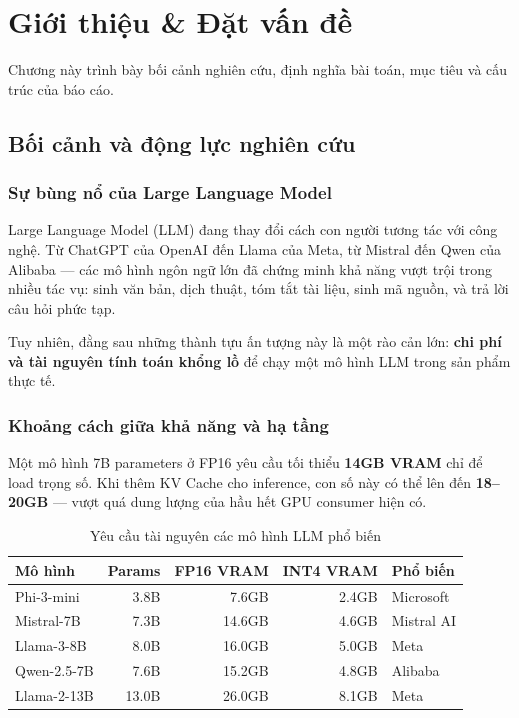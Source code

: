 \documentclass[12pt,a4paper]{report}
\begin{document}
\newpage

\chapter{Giới thiệu \& Đặt vấn đề}

Chương này trình bày bối cảnh nghiên cứu, định nghĩa bài toán, mục tiêu và cấu trúc của báo cáo.

\section{Bối cảnh và động lực nghiên cứu}

\subsection{Sự bùng nổ của Large Language Model}

Large Language Model (LLM) đang thay đổi cách con người tương tác với công nghệ. Từ ChatGPT của OpenAI đến Llama của Meta, từ Mistral đến Qwen của Alibaba --- các mô hình ngôn ngữ lớn đã chứng minh khả năng vượt trội trong nhiều tác vụ: sinh văn bản, dịch thuật, tóm tắt tài liệu, sinh mã nguồn, và trả lời câu hỏi phức tạp.

Tuy nhiên, đằng sau những thành tựu ấn tượng này là một rào cản lớn: \textbf{chi phí và tài nguyên tính toán khổng lồ} để chạy một mô hình LLM trong sản phẩm thực tế.

\subsection{Khoảng cách giữa khả năng và hạ tầng}

Một mô hình 7B parameters ở FP16 yêu cầu tối thiểu \textbf{14GB VRAM} chỉ để load trọng số. Khi thêm KV Cache cho inference, con số này có thể lên đến \textbf{18--20GB} --- vượt quá dung lượng của hầu hết GPU consumer hiện có.

\begin{table}[h]
\centering
\caption{Yêu cầu tài nguyên các mô hình LLM phổ biến}
\label{tab:model-requirements}
\begin{tabular}{lrrrl}
\toprule
\textbf{Mô hình} & \textbf{Params} & \textbf{FP16 VRAM} & \textbf{INT4 VRAM} & \textbf{Phổ biến} \\
\midrule
Phi-3-mini & 3.8B & 7.6GB & 2.4GB & Microsoft \\
Mistral-7B & 7.3B & 14.6GB & 4.6GB & Mistral AI \\
Llama-3-8B & 8.0B & 16.0GB & 5.0GB & Meta \\
Qwen-2.5-7B & 7.6B & 15.2GB & 4.8GB & Alibaba \\
Llama-2-13B & 13.0B & 26.0GB & 8.1GB & Meta \\
\bottomrule
\end{tabular}
\end{table}
\end{document}
